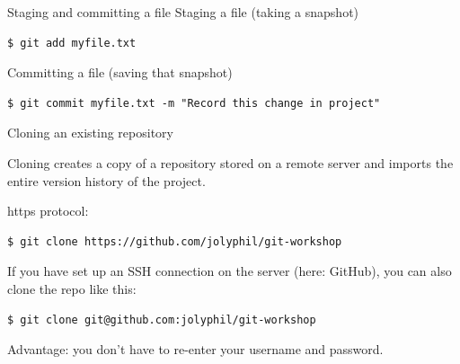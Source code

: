 \documentclass[handout]{beamer}
\begin{document}
\begin{frame}[fragile]{Staging and committing a file}
Staging a file (taking a snapshot)
\begin{lstlisting}
$ git add myfile.txt
\end{lstlisting}
Committing a file (saving that snapshot)
\begin{lstlisting}
$ git commit myfile.txt -m "Record this change in project"
\end{lstlisting}
\end{frame}

\begin{frame}[fragile]{Cloning an existing repository}

Cloning creates a copy of a repository stored on a remote server and imports the entire version history of the project. 

\vspace{0.5cm}

https protocol:
	
\begin{lstlisting}
$ git clone https://github.com/jolyphil/git-workshop
\end{lstlisting}

If you have set up an SSH connection on the server (here: GitHub), you can also clone the repo like this: 

\begin{lstlisting}
$ git clone git@github.com:jolyphil/git-workshop
\end{lstlisting}

Advantage: you don't have to re-enter your username and password. 

\end{frame}
\end{document}
